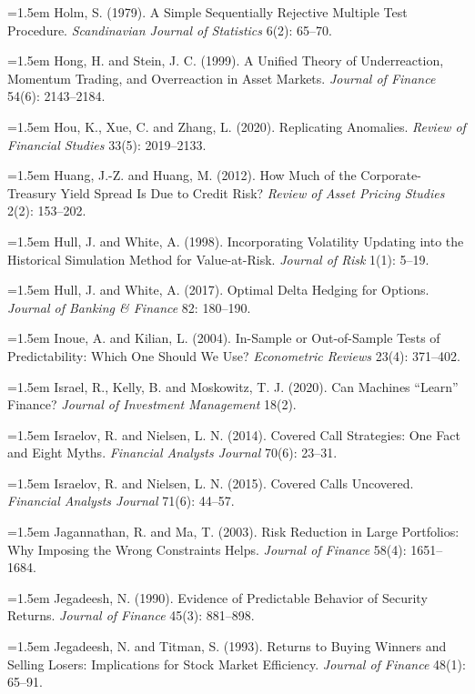 \hangindent=1.5em Holm, S. (1979). A Simple Sequentially Rejective Multiple Test Procedure. \emph{Scandinavian Journal of Statistics} 6(2): 65--70.

\hangindent=1.5em Hong, H. and Stein, J. C. (1999). A Unified Theory of Underreaction, Momentum Trading, and Overreaction in Asset Markets. \emph{Journal of Finance} 54(6): 2143--2184.

\hangindent=1.5em Hou, K., Xue, C. and Zhang, L. (2020). Replicating Anomalies. \emph{Review of Financial Studies} 33(5): 2019--2133.

\hangindent=1.5em Huang, J.-Z. and Huang, M. (2012). How Much of the Corporate-Treasury Yield Spread Is Due to Credit Risk? \emph{Review of Asset Pricing Studies} 2(2): 153--202.

\hangindent=1.5em Hull, J. and White, A. (1998). Incorporating Volatility Updating into the Historical Simulation Method for Value-at-Risk. \emph{Journal of Risk} 1(1): 5--19.

\hangindent=1.5em Hull, J. and White, A. (2017). Optimal Delta Hedging for Options. \emph{Journal of Banking \& Finance} 82: 180--190.

\hangindent=1.5em Inoue, A. and Kilian, L. (2004). In-Sample or Out-of-Sample Tests of Predictability: Which One Should We Use? \emph{Econometric Reviews} 23(4): 371--402.

\hangindent=1.5em Israel, R., Kelly, B. and Moskowitz, T. J. (2020). Can Machines ``Learn'' Finance? \emph{Journal of Investment Management} 18(2).

\hangindent=1.5em Israelov, R. and Nielsen, L. N. (2014). Covered Call Strategies: One Fact and Eight Myths. \emph{Financial Analysts Journal} 70(6): 23--31.

\hangindent=1.5em Israelov, R. and Nielsen, L. N. (2015). Covered Calls Uncovered. \emph{Financial Analysts Journal} 71(6): 44--57.

\hangindent=1.5em Jagannathan, R. and Ma, T. (2003). Risk Reduction in Large Portfolios: Why Imposing the Wrong Constraints Helps. \emph{Journal of Finance} 58(4): 1651--1684.

\hangindent=1.5em Jegadeesh, N. (1990). Evidence of Predictable Behavior of Security Returns. \emph{Journal of Finance} 45(3): 881--898.

\hangindent=1.5em Jegadeesh, N. and Titman, S. (1993). Returns to Buying Winners and Selling Losers: Implications for Stock Market Efficiency. \emph{Journal of Finance} 48(1): 65--91.

